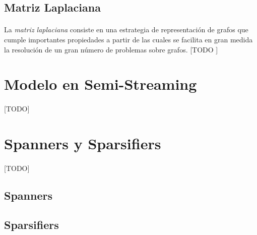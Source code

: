\documentclass{subfiles}
\begin{document}
      \subsection{Matriz Laplaciana}
      \label{sec:laplacian_matrix}

        \paragraph{}
        La \emph{matriz laplaciana} consiste en una estrategia de representación de grafos que cumple importantes propiedades a partir de las cuales se facilita en gran medida la resolución de un gran número de problemas sobre grafos. [TODO ]


    \section{Modelo en Semi-Streaming}
    \label{sec:semi_streaming_model}

      \paragraph{}
      [TODO]

    \section{Spanners y Sparsifiers}
    \label{sec:spanners_sparsifiers}

      \paragraph{}
      [TODO]

      \subsection{Spanners}
      \label{sec:spanners}

        \paragraph{}

      \subsection{Sparsifiers}
      \label{sec:sparsifiers}

        \paragraph{}
\end{document}
